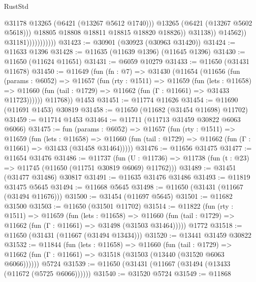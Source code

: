 \begin{lexlean}{RustStd}
\begin{coremodule}
                                          @31178
                                          @13265
                                          (@6421 (@13267 @5612 @1740)))
                                        @13265
                                        (@6421 (@13267 @5602 @5618)))
                                      @18805
                                      @18808
                                      @18811
                                      @18815
                                      @18820
                                      @18826))
                                  @31138))
                              @14562))
                          @31181)))))))))))
@31423 := @30901 (@30923 (@30963 @31420))
@31424 := @11633 @1396
@31428 := @11635 (@11639 @1396) (@11645 @1396)
@31430 := @11650 (@11624 @11651)
@31431 := @6059 @10279
@31433 := @11650 (@31431 @11678)
@31450 := @11649
    (fun (fn : @7) =>
    @31430
      (@11654
        (@11656
          (fun (params : @6052) =>
          @11657
            (fun (rty : @1511) =>
            @11659
              (fun (lets : @11658) =>
              @11660 (fun (tail : @1729) => @11662 (fun (Γ : @11661) => @31433 @11723))))))
        @11768))
    @1453
@31451 := @11774 @11626
@31454 := @11690 (@11691 @1453) @30819
@31458 := @11650 (@11682 (@31454 @11698) @11702)
@31459 := @11714 @1453
@31464 := @11711 (@11713 @31459 @30822 @6063 @6066)
@31475 := fun (params : @6052) =>
  @11657
    (fun (rty : @1511) =>
    @11659
      (fun (lets : @11658) =>
      @11660 (fun (tail : @1729) => @11662 (fun (Γ : @11661) => @31433 (@31458 @31464)))))
@31476 := @11656 @31475
@31477 := @11654 @31476
@31486 := @11737
    (fun (U : @11736) => @11738 (fun (t : @23) => @11745 (@11650 (@11751 @30819 @6069) @11762)))
@31489 := @31451 (@31477 @31486) @30817
@31491 := @11635 @31476 @31486
@31493 := @11819 @31475 @5645
@31494 := @11668 @5645
@31498 := @11650 (@31431 (@11667 (@31494 @11676)))
@31500 := @31454 (@11697 @5645)
@31501 := @11682 @31500
@31503 := @11650 (@31501 @11702)
@31514 := @11822
    (fun (rty : @1511) =>
    @11659
      (fun (lets : @11658) =>
      @11660 (fun (tail : @1729) => @11662 (fun (Γ : @11661) => @31498 (@31503 @31464)))))
    @1772
@31518 := @11650 (@31431 (@11667 (@31494 @13434)))
@31520 := @13441 @31459 @30822
@31532 := @11844
    (fun (lets : @11658) =>
    @11660
      (fun (tail : @1729) =>
      @11662 (fun (Γ : @11661) => @31518 (@31503 (@13440 (@31520 @6063 @6066))))))
    @5724
@31539 := @11650 (@31431 (@11667 (@31494 (@13433 (@11672 (@5725 @6066))))))
@31540 := @31520 @5724
@31549 := @11868

\end{coremodule}
\end{lexlean}
